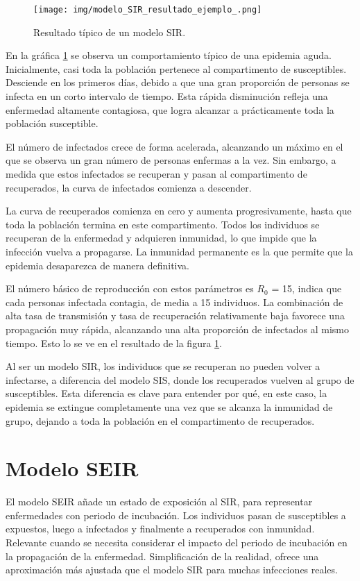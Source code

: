 \begin{figure}[H]
    \centering
    \texttt{[image: img/modelo\_SIR\_resultado\_ejemplo\_.png]}
    \caption{Resultado típico de un modelo SIR.}
    \label{fig:ejemplo SIR}
    \vspace{0.5cm} %
\end{figure}


En la gráfica \ref{fig:ejemplo SIR} se observa un comportamiento típico de una epidemia aguda.
Inicialmente, casi toda la población pertenece al compartimento de susceptibles. Desciende en los primeros días, debido a que una gran proporción de personas se infecta en un corto intervalo de tiempo. Esta rápida disminución refleja una enfermedad altamente contagiosa, que logra alcanzar a prácticamente toda la población susceptible.

El número de infectados crece de forma acelerada, alcanzando un máximo en el que se observa un gran número de personas enfermas a la vez. Sin embargo, a medida que estos infectados se recuperan y pasan al compartimento de recuperados, la curva de infectados comienza a descender.

La curva de recuperados comienza en cero y aumenta progresivamente, hasta que toda la población termina en este compartimento. Todos los individuos se recuperan de la enfermedad y adquieren inmunidad, lo que impide que la infección vuelva a propagarse. La inmunidad permanente es la que permite que la epidemia desaparezca de manera definitiva.

El número básico de reproducción con estos parámetros es $R_0$ = 15, indica que cada personas infectada contagia, de media a 15 individuos. La combinación de alta tasa de transmisión y tasa de recuperación relativamente baja favorece una propagación muy rápida, alcanzando una alta proporción de infectados al mismo tiempo. Esto lo se ve en el resultado de la figura \ref{fig:ejemplo SIR}.

Al ser un modelo SIR, los individuos que se recuperan no pueden volver a infectarse, a diferencia del modelo SIS, donde los recuperados vuelven al grupo de susceptibles. Esta diferencia es clave para entender por qué, en este caso, la epidemia se extingue completamente una vez que se alcanza la inmunidad de grupo, dejando a toda la población en el compartimento de recuperados.




\section{Modelo SEIR}
El modelo SEIR añade un estado de exposición al SIR, para representar enfermedades con periodo de incubación. Los individuos pasan de susceptibles a expuestos, luego a infectados y finalmente a recuperados con inmunidad. Relevante cuando se necesita considerar el impacto del periodo de incubación en la propagación de la enfermedad. Simplificación de la realidad, ofrece una aproximación más ajustada que el modelo SIR para muchas infecciones reales.

